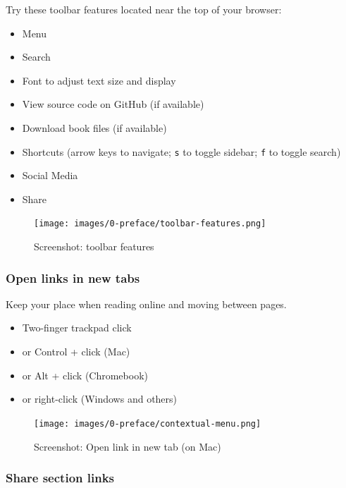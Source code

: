 \documentclass[
  english,
]{book}
\providecommand{\tightlist}{%
  \setlength{\itemsep}{0pt}\setlength{\parskip}{0pt}}
\begin{document}
Try these toolbar features located near the top of your browser:

\begin{itemize}
\tightlist
\item
  Menu
\item
  Search
\item
  Font to adjust text size and display
\item
  View source code on GitHub (if available)
\item
  Download book files (if available)
\item
  Shortcuts (arrow keys to navigate; \texttt{s} to toggle sidebar; \texttt{f} to toggle search)
\item
  Social Media
\item
  Share
\end{itemize}

\begin{figure}
\centering
\texttt{[image: images/0-preface/toolbar-features.png]}
\caption{Screenshot: toolbar features}
\end{figure}

\hypertarget{open-links-in-new-tabs}{%
\subsubsection*{Open links in new tabs}\label{open-links-in-new-tabs}}

Keep your place when reading online and moving between pages.

\begin{itemize}
\tightlist
\item
  Two-finger trackpad click
\item
  or Control + click (Mac)
\item
  or Alt + click (Chromebook)
\item
  or right-click (Windows and others)
\end{itemize}

\begin{figure}
\centering
\texttt{[image: images/0-preface/contextual-menu.png]}
\caption{Screenshot: Open link in new tab (on Mac)}
\end{figure}

\hypertarget{share-section-links}{%
\subsubsection*{Share section links}\label{share-section-links}}
\end{document}
